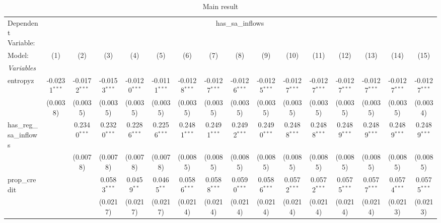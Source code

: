 
\begin{table}[htbp]
   \centering
   \caption{\label{tab:reg_csw0} Main result}
   \begin{tiny}
      \begin{tabular}{lccccccccccccccc}
         \tabularnewline\midrule\midrule
         Dependent Variable: & \multicolumn{15}{c}{has\_sa\_inflows}\\
         Model:                   & (1)             & (2)             & (3)             & (4)             & (5)             & (6)             & (7)             & (8)             & (9)             & (10)            & (11)            & (12)            & (13)            & (14)            & (15)\\
         \midrule \emph{Variables} &   &   &   &   &   &   &   &   &   &   &   &   &   &   &  \\
         entropyz                 & -0.0231$^{***}$ & -0.0172$^{***}$ & -0.0153$^{***}$ & -0.0120$^{***}$ & -0.0111$^{***}$ & -0.0128$^{***}$ & -0.0127$^{***}$ & -0.0126$^{***}$ & -0.0125$^{***}$ & -0.0127$^{***}$ & -0.0127$^{***}$ & -0.0127$^{***}$ & -0.0127$^{***}$ & -0.0127$^{***}$ & -0.0127$^{***}$\\
                                  & (0.0038)        & (0.0035)        & (0.0035)        & (0.0035)        & (0.0035)        & (0.0035)        & (0.0035)        & (0.0035)        & (0.0035)        & (0.0035)        & (0.0035)        & (0.0035)        & (0.0035)        & (0.0035)        & (0.0034)\\
         has\_reg\_sa\_inflows &                 & 0.2340$^{***}$  & 0.2320$^{***}$  & 0.2286$^{***}$  & 0.2256$^{***}$  & 0.2481$^{***}$  & 0.2491$^{***}$  & 0.2492$^{***}$  & 0.2490$^{***}$  & 0.2488$^{***}$  & 0.2488$^{***}$  & 0.2489$^{***}$  & 0.2489$^{***}$  & 0.2489$^{***}$  & 0.2489$^{***}$\\
                                  &                 & (0.0078)        & (0.0078)        & (0.0078)        & (0.0078)        & (0.0085)        & (0.0085)        & (0.0085)        & (0.0085)        & (0.0085)        & (0.0085)        & (0.0085)        & (0.0085)        & (0.0085)        & (0.0085)\\
         prop\_credit            &                 &                 & 0.0583$^{***}$  & 0.0459$^{**}$   & 0.0465$^{**}$   & 0.0586$^{***}$  & 0.0588$^{***}$  & 0.0590$^{***}$  & 0.0586$^{***}$  & 0.0572$^{***}$  & 0.0572$^{***}$  & 0.0575$^{***}$  & 0.0577$^{***}$  & 0.0574$^{***}$  & 0.0575$^{***}$\\
                                  &                 &                 & (0.0217)        & (0.0217)        & (0.0217)        & (0.0214)        & (0.0214)        & (0.0214)        & (0.0214)        & (0.0214)        & (0.0214)        & (0.0214)        & (0.0214)        & (0.0213)        & (0.0213)\\

\end{tabular}
\end{tiny}
\end{table}
